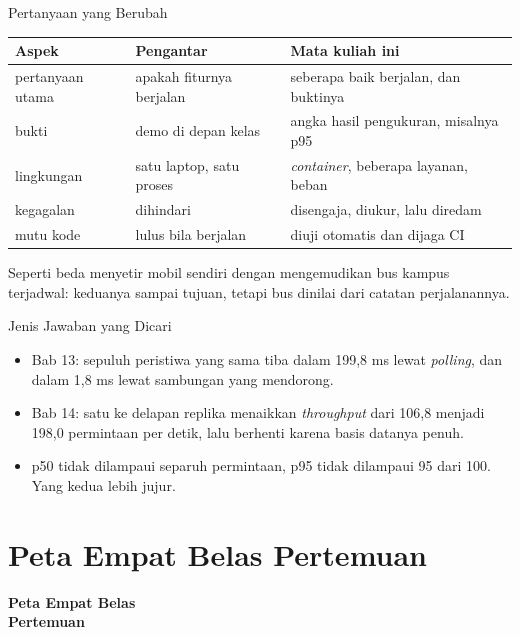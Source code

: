\documentclass[aspectratio=169, table, 12pt]{beamer}
\begin{document}
\begin{frame}{{\Large Pertanyaan yang Berubah}}
  \vspace{6pt}
  \centering
  {\footnotesize
  \begin{tabularx}{\textwidth}{lYY}
    \hline
    \textbf{Aspek} & \textbf{Pengantar} & \textbf{Mata kuliah ini} \\
    \hline
    pertanyaan utama & apakah fiturnya berjalan & seberapa baik berjalan, dan buktinya \\
    \hline
    bukti & demo di depan kelas & angka hasil pengukuran, misalnya p95 \\
    \hline
    lingkungan & satu laptop, satu proses & \textit{container}, beberapa layanan, beban \\
    \hline
    kegagalan & dihindari & disengaja, diukur, lalu diredam \\
    \hline
    mutu kode & lulus bila berjalan & diuji otomatis dan dijaga CI \\
    \hline
  \end{tabularx}}

  \vspace{6pt}
  {\small Seperti beda menyetir mobil sendiri dengan mengemudikan bus kampus
  terjadwal: keduanya sampai tujuan, tetapi bus dinilai dari catatan
  perjalanannya.}
\end{frame}

\begin{frame}{{\Large Jenis Jawaban yang Dicari}}
  \vspace{12pt}
  \begin{itemize}
    \item Bab 13: sepuluh peristiwa yang sama tiba dalam 199,8 ms lewat
          \textit{polling}, dan dalam 1,8 ms lewat sambungan yang mendorong.
    \item Bab 14: satu ke delapan replika menaikkan \textit{throughput} dari
          106,8 menjadi 198,0 permintaan per detik, lalu berhenti karena basis
          datanya penuh.
    \item p50 tidak dilampaui separuh permintaan, p95 tidak dilampaui 95 dari
          100. Yang kedua lebih jujur.
  \end{itemize}
\end{frame}

\section{Peta Empat Belas Pertemuan}

\begin{frame}{\hfill}
  \centering
  \Huge{\textbf{Peta Empat Belas\\Pertemuan}}
\end{frame}
\end{document}
